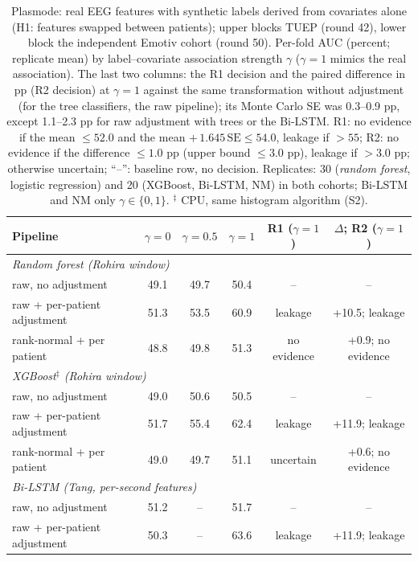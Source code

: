 \begin{table}[t]
\caption{Plasmode: real EEG features with synthetic labels derived from covariates alone (H1: features swapped between patients); upper blocks TUEP (round 42), lower block the independent Emotiv cohort (round 50). Per-fold AUC (percent; replicate mean) by label--covariate association strength $\gamma$ ($\gamma=1$ mimics the real association). The last two columns: the R1 decision and the paired difference in pp (R2 decision) at $\gamma=1$ against the same transformation without adjustment (for the tree classifiers, the raw pipeline); its Monte Carlo SE was 0.3--0.9 pp, except 1.1--2.3 pp for raw adjustment with trees or the Bi-LSTM. R1: no evidence if the mean $\leq 52.0$ and the mean $+\,1.645\,\mathrm{SE} \leq 54.0$, leakage if $> 55$; R2: no evidence if the difference $\leq 1.0$ pp (upper bound $\leq 3.0$ pp), leakage if $> 3.0$ pp; otherwise uncertain; ``--'': baseline row, no decision. Replicates: 30 (\textit{random forest}, logistic regression) and 20 (XGBoost, Bi-LSTM, NM) in both cohorts; Bi-LSTM and NM only $\gamma\in\{0,1\}$. $^{\ddagger}$ CPU, same histogram algorithm (S2).}\label{tab:plasmode}
\centering\scriptsize
\setlength{\tabcolsep}{2.5pt}
\begin{tabular}{p{}ccccc}
\toprule
Pipeline & $\gamma=0$ & $\gamma=0.5$ & $\gamma=1$ & R1 ($\gamma=1$) & $\Delta$; R2 ($\gamma=1$) \\
\midrule
\multicolumn{6}{l}{\textit{Random forest (Rohira window)}} \\
\quad raw, no adjustment & 49.1 & 49.7 & 50.4 & -- & -- \\
\quad raw + per-patient adjustment & 51.3 & 53.5 & 60.9 & leakage & +10.5; leakage \\
\quad rank-normal + per patient & 48.8 & 49.8 & 51.3 & no evidence & +0.9; no evidence \\
\multicolumn{6}{l}{\textit{XGBoost$^{\ddagger}$ (Rohira window)}} \\
\quad raw, no adjustment & 49.0 & 50.6 & 50.5 & -- & -- \\
\quad raw + per-patient adjustment & 51.7 & 55.4 & 62.4 & leakage & +11.9; leakage \\
\quad rank-normal + per patient & 49.0 & 49.7 & 51.1 & uncertain & +0.6; no evidence \\
\multicolumn{6}{l}{\textit{Bi-LSTM (Tang, per-second features)}} \\
\quad raw, no adjustment & 51.2 & -- & 51.7 & -- & -- \\
\quad raw + per-patient adjustment & 50.3 & -- & 63.6 & leakage & +11.9; leakage \\

\end{tabular}
\end{table}
